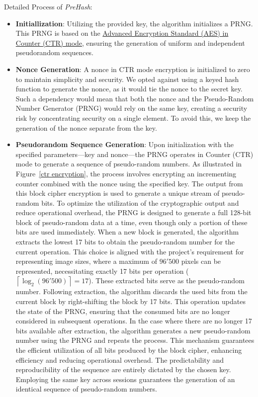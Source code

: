Detailed Process of \textit{PreHash}:
\begin{itemize}
    \item \textbf{Initiallization}: Utilizing the provided key, the algorithm initializes a PRNG. This PRNG is based on the \hyperref[def:AES CTR mode]{Advanced Encryption Standard (AES) in Counter (CTR) mode}, ensuring the generation of uniform and independent pseudorandom sequences.

    \item \textbf{Nonce Generation}: A nonce in CTR mode encryption is initialized to zero to maintain simplicity and security. We opted against using a keyed hash function to generate the nonce, as it would tie the nonce to the secret key. Such a dependency would mean that both the nonce and the Pseudo-Random Number Generator (PRNG) would rely on the same key, creating a security risk by concentrating security on a single element. To avoid this, we keep the generation of the nonce separate from the key.

    \item \textbf{Pseudorandom Sequence Generation}: Upon initialization with the specified parameters—key and nonce—the PRNG operates in Counter (CTR) mode to generate a sequence of pseudo-random numbers. As illustrated in Figure~\ref{ctr encryption}, the process involves encrypting an incrementing counter combined with the nonce using the specified key. The output from this block cipher encryption is used to generate a unique stream of pseudo-random bits.
    To optimize the utilization of the cryptographic output and reduce operational overhead, the PRNG is designed to generate a full 128-bit block of pseudo-random data at a time, even though only a portion of these bits are used immediately. When a new block is generated, the algorithm extracts the lowest 17 bits to obtain the pseudo-random number for the current operation. This choice is aligned with the project's requirement for representing image sizes, where a maximum of \(96'500\) pixels can be represented, necessitating exactly 17 bits per operation (\(\left\lceil \log_2(96'500) \right\rceil = 17\)). These extracted bits serve as the pseudo-random number.
    Following extraction, the algorithm discards the used bits from the current block by right-shifting the block by 17 bits. This operation updates the state of the PRNG, ensuring that the consumed bits are no longer considered in subsequent operations. In the case where there are no longer 17 bits available after extraction, the algorithm generates a new pseudo-random number using the PRNG and repeats the process. This mechanism guarantees the efficient utilization of all bits produced by the block cipher, enhancing efficiency and reducing operational overhead.
    The predictability and reproducibility of the sequence are entirely dictated by the chosen key. Employing the same key across sessions guarantees the generation of an identical sequence of pseudo-random numbers.
    

\end{itemize}
